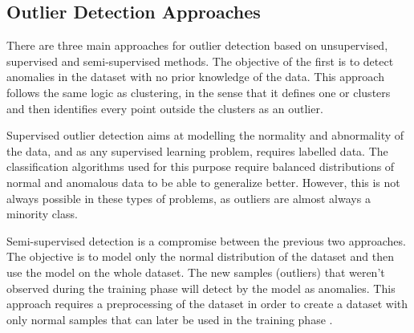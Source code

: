 \subsection{Outlier Detection Approaches}
There are three main approaches for outlier detection based on unsupervised, supervised and semi-supervised methods. The objective of the first is to detect anomalies in the dataset with no prior knowledge of the data. This approach follows the same logic as clustering, in the sense that it defines one or clusters and then identifies every point outside the clusters as an outlier.

Supervised outlier detection aims at modelling the normality and abnormality of the data, and as any supervised learning problem, requires labelled data. The classification algorithms used for this purpose require balanced distributions of normal and anomalous data to be able to generalize better. However, this is not always possible in these types of problems, as outliers are almost always a minority class.

Semi-supervised detection is a compromise between the previous two approaches. The objective is to model only the normal distribution of the dataset and then use the model on the whole dataset. The new samples (outliers) that weren't observed during the training phase will detect by the model as anomalies. This approach requires a preprocessing of the dataset in order to create a dataset with only normal samples that can later be used in the training phase \cite{hodge.austin_SurveyOutlierDetection_2004}.


